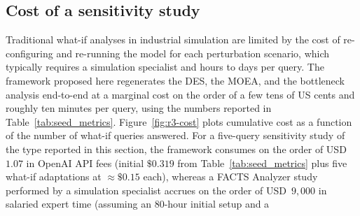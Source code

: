 \documentclass[a4paper,fleqn]{cas-sc}
\begin{document}
  \subsection{Cost of a sensitivity study}\label{sec:res-r3}                                                                                
                                                                                                                                            
  Traditional what-if analyses in industrial simulation are limited by                                                                      
  the cost of re-configuring and re-running the model for each
  perturbation scenario, which typically requires a simulation                                                                              
  specialist and hours to days per query. The framework proposed here                                                                       
  regenerates the DES, the MOEA, and the bottleneck analysis end-to-end                                                                     
  at a marginal cost on the order of a few tens of US cents and roughly                                                                     
  ten minutes per query, using the numbers reported in                                                                                      
  Table~\ref{tab:seed_metrics}. Figure~\ref{fig:r3-cost} plots                                                                              
  cumulative cost as a function of the number of what-if queries                                                                            
  answered. For a five-query sensitivity study of the type reported in                                                                      
  this section, the framework consumes on the order of USD~$1.07$ in                                                                        
  OpenAI API fees (initial $\$0.319$ from                                                                                                   
  Table~\ref{tab:seed_metrics} plus five what-if adaptations at                                                                             
  $\approx\$0.15$ each), whereas a FACTS Analyzer study performed by a                                                                      
  simulation specialist accrues on the order of USD~$9{,}000$ in                                                                            
  salaried expert time (assuming an $80$-hour initial setup and a                                                                           
\end{document}
